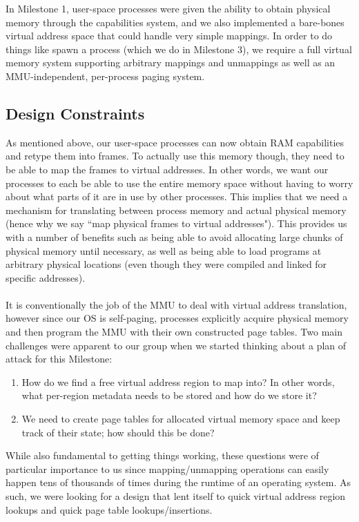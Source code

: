 In Milestone 1, user-space processes were given the ability to obtain physical memory through the capabilities system, and we also implemented a bare-bones virtual address space that could handle very simple mappings. In order to do things like spawn a process (which we do in Milestone 3), we require a full virtual memory system supporting arbitrary mappings and unmappings as well as an MMU-independent, per-process paging system.

\subsection{Design Constraints}
As mentioned above, our user-space processes can now obtain RAM capabilities and retype them into frames. To actually use this memory though, they need to be able to map the frames to virtual addresses. In other words, we want our processes to each be able to use the entire memory space without having to worry about what parts of it are in use by other processes. This implies that we need a mechanism for translating between process memory and actual physical memory (hence why we say ``map physical frames to virtual addresses"). This provides us with a number of benefits such as being able to avoid allocating large chunks of physical memory until necessary, as well as being able to load programs at arbitrary physical locations (even though they were compiled and linked for specific addresses).
\\\\
It is conventionally the job of the MMU to deal with virtual address translation, however since our OS is self-paging, processes explicitly acquire physical memory and then program the MMU with their own constructed page tables. Two main challenges were apparent to our group when we started thinking about a plan of attack for this Milestone:
\begin{enumerate}[itemsep=0pt]
    \item How do we find a free virtual address region to map into? In other words, what per-region metadata needs to be stored and how do we store it?
    \item We need to create page tables for allocated virtual memory space and keep track of their state; how should this be done?
\end{enumerate}
While also fundamental to getting things working, these questions were of particular importance to us since mapping/unmapping operations can easily happen tens of thousands of times during the runtime of an operating system. As such, we were looking for a design that lent itself to quick virtual address region lookups and quick page table lookups/insertions. 

